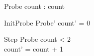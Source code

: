 \documentclass{article}
\begin{document}
\begin{schema}{Probe}
  count : \nat
\where
  count 
\end{schema}
\begin{schema}{InitProbe}
  Probe'
\where
  count' = 0
\end{schema}
\begin{schema}{Step}
  \Delta Probe
\where
  count < 2 \\
  count' = count + 1
\end{schema}
\end{document}
